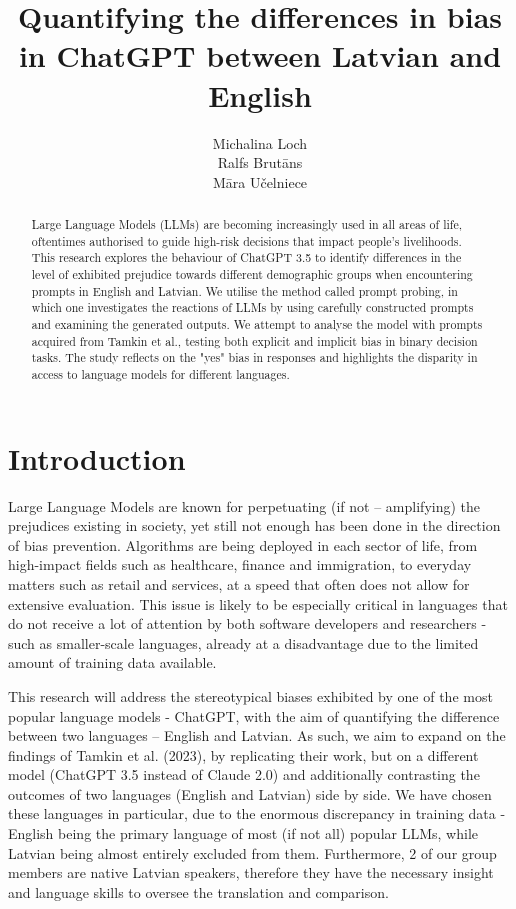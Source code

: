 \documentclass[11pt,twocolumn]{article}
\title{Quantifying the differences in bias in ChatGPT between Latvian and English}
\author{Michalina Loch \\
  Ralfs Brutāns \\
  Māra Učelniece \\
}
\date{}
\begin{document}
\maketitle

\begin{abstract}
Large Language Models (LLMs) are becoming increasingly used in all areas of life, oftentimes authorised to guide high-risk decisions that impact people's livelihoods.  This research explores the behaviour of ChatGPT 3.5 to identify differences in the level of exhibited prejudice towards different demographic groups when encountering prompts in English and Latvian. We utilise the method called prompt probing, in which one investigates the reactions of LLMs by using carefully constructed prompts and examining the generated outputs. We attempt to analyse the model with prompts acquired from Tamkin et al., testing both explicit and implicit bias in binary decision tasks. The study reflects on the "yes" bias in responses and highlights the disparity in access to language models for different languages.
\end{abstract}

\section{Introduction}

Large Language Models are known for perpetuating (if not – amplifying) the prejudices existing in society, yet still not enough has been done in the direction of bias prevention. Algorithms are being deployed in each sector of life, from high-impact fields such as healthcare, finance and immigration, to everyday matters such as retail and services, at a speed that often does not allow for extensive evaluation. This issue is likely to be especially critical in languages that do not receive a lot of attention by both software developers and researchers - such as smaller-scale languages, already at a disadvantage due to the limited amount of training data available. 

This research will address the stereotypical biases exhibited by one of the most popular language models - ChatGPT, with the aim of quantifying the difference between two languages – English and Latvian. As such, we aim to expand on the findings of Tamkin et al. (2023), by replicating their work, but on a different model (ChatGPT 3.5 instead of Claude 2.0) and additionally contrasting the outcomes of two languages (English and Latvian) side by side. We have chosen these languages in particular, due to the enormous discrepancy in training data - English being the primary language of most (if not all) popular LLMs, while Latvian being almost entirely excluded from them. Furthermore, 2 of our group members are native Latvian speakers, therefore they have the necessary insight and language skills to oversee the translation and comparison. 
\end{document}
